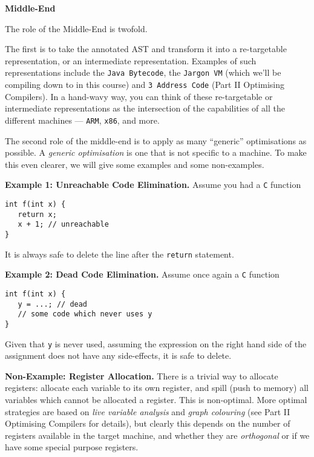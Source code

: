 \begin{minipage}[t]{0.15\textwidth}
\textbf{\sffamily Middle-End}    
\end{minipage}%
\begin{minipage}[t]{0.85\textwidth}    
    The role of the Middle-End is twofold. 

    The first is to take the annotated AST and transform it into a re-targetable representation, or an intermediate representation. Examples of such representations include the \texttt{Java Bytecode}, the \texttt{Jargon VM} (which we'll be compiling down to in this course) and \texttt{3 Address Code} ({\sffamily Part II Optimising Compilers}). In a hand-wavy way, you can think of these re-targetable or intermediate representations as the intersection of the capabilities of all the different machines --- \texttt{ARM}, \texttt{x86}, and more. 

    The second role of the middle-end is to apply as many ``generic'' optimisations as possible. A \emph{generic optimisation} is one that is not specific to a machine. To make this even clearer, we will give some examples and some non-examples. 

    \textbf{Example 1: Unreachable Code Elimination.} Assume you had a \texttt{C} function

    \begin{verbatim}
int f(int x) {
   return x;
   x + 1; // unreachable
}
    \end{verbatim}

    It is always safe to delete the line after the \texttt{return} statement. 

    \textbf{Example 2: Dead Code Elimination.} Assume once again a \texttt{C} function

    \begin{verbatim}
int f(int x) {
   y = ...; // dead
   // some code which never uses y
}
    \end{verbatim}

    Given that \texttt{y} is never used, assuming the expression on the right hand side of the assignment does not have any side-effects, it is safe to delete.
    
    \textbf{Non-Example: Register Allocation.} There is a trivial way to allocate registers: allocate each variable to its own register, and spill (push to memory) all variables which cannot be allocated a register. This is non-optimal. More optimal strategies are based on \textit{live variable analysis} and \textit{graph colouring} (see {\sffamily Part II Optimising Compilers} for details), but clearly this depends on the number of registers available in the target machine, and whether they are \emph{orthogonal} or if we have some special purpose registers.

\end{minipage}

